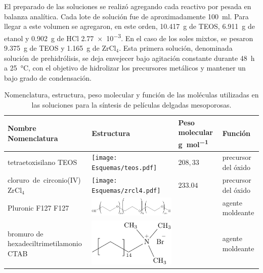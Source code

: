 			El preparado de las soluciones se realizó agregando cada reactivo por pesada en balanza analítica. Cada lote de solución fue de aproximadamente \SI{100}{\ml}. Para llegar a este volumen se agregaron, en este orden, \SI{10.417}{\gram} de TEOS, \SI{6.911}{\gram} de etanol y \SI{0.902}{\gram} de HCl \SI{2,77e-3}{\Molar}. En el caso de los soles mixtos, se pesaron \SI{9.375}{\gram} de TEOS y \SI{1.165}{\gram} de ZrCl$_4$. Esta primera solución, denominada solución de prehidrólisis, se deja envejecer bajo agitación constante durante \SI{48}{\hour} a \SI{25}{\celsius}, con el objetivo de hidrolizar los precursores metálicos y mantener un bajo grado de condensación.\cite{Grosso2001}

				\begin{table}[ht!] 
						  \caption[Reactivos para los soles]{Nomenclatura, estructura, peso molecular y función de las moléculas utilizadas en las soluciones para la síntesis de películas delgadas mesoporosas.} 
				  		  \begin{tabular}{>{\raggedright\arraybackslash}m{2.40cm}>{\centering\arraybackslash}m{4cm}>{\centering\arraybackslash}m{2.35cm}>{\raggedright\arraybackslash}m{1.7cm}} 
				  		  \toprule
						  Nombre Nomenclatura    & Estructura & Peso molecular \si{g.mol^{-1}} & Función\\ \midrule
				      	  tetraetoxisilano TEOS & \texttt{[image: Esquemas/teos.pdf]} & $208,33$ & precursor del óxido  \\ \midrule
				      	  \mbox{cloruro de circonio(IV)}  ZrCl$_4$ & \texttt{[image: Esquemas/zrcl4.pdf]} & $233.04$ & precursor del óxido  \\ \midrule
				  		  Pluronic F127 F127    & \hspace*{-10px} \includegraphics[scale=0.5]{Esquemas/f127.pdf} & \multirow{1}{*}{$13800$}	 & agente moldeante	 \\ \midrule
				  		  bromuro de hexadeciltrimetilamonio  CTAB   & \hspace*{1cm} \includegraphics[scale=0.6]{Esquemas/ctab.pdf} & \multirow{1}{*}{$364.48$}	 & agente moldeante	 \\ \midrule

\end{tabular}
\end{table}
